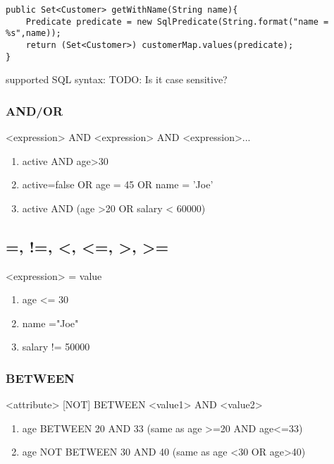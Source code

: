 \begin{verbatim}
public Set<Customer> getWithName(String name){
    Predicate predicate = new SqlPredicate(String.format("name = %s",name));
    return (Set<Customer>) customerMap.values(predicate);
}
\end{verbatim}

supported SQL syntax:
TODO: Is it case sensitive?

\subsubsection{AND/OR}
<expression> AND <expression> AND <expression>...
\begin{enumerate}
\item active AND age>30
\item active=false OR age = 45 OR name = 'Joe'
\item active AND (age >20 OR salary < 60000)
\end{enumerate}

\subsection{=, !=, <, <=, >, >=}
<expression> = value
\begin{enumerate}
\item age <= 30
\item name ="Joe"
\item salary != 50000
\end{enumerate}

\subsubsection{BETWEEN}
<attribute> [NOT] BETWEEN <value1> AND <value2>

\begin{enumerate}
\item age BETWEEN 20 AND 33 (same as age >=20 AND age<=33)
\item age NOT BETWEEN 30 AND 40 (same as age <30 OR age>40)
\end{enumerate}


